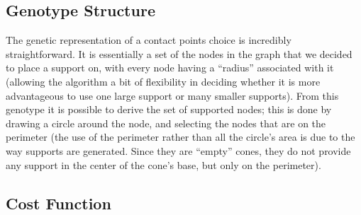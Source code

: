 \subsection{Genotype Structure}
\label{sec:contact_points_opt_gs}

The genetic representation of a contact points choice is incredibly straightforward.
It is essentially a set of the nodes in the graph that we decided to place a support on,
with every node having a ``radius'' associated with it (allowing the algorithm
a bit of flexibility in deciding whether it is more advantageous to use one large
support or many smaller supports).
From this genotype it is possible to derive the set of supported nodes;
this is done by drawing a circle around the node, and selecting the nodes
that are on the perimeter (the use of the perimeter rather than all the circle's area
is due to the way supports are generated. Since they are ``empty'' cones, they
do not provide any support in the center of the cone's base, but only on the perimeter).

\subsection{Cost Function}
\label{sec:contact_points_opt_cf}

